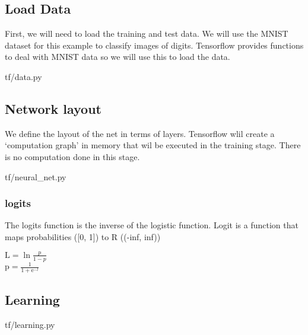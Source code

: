 \documentclass[11pt,a4paper]{article}
\begin{document}
\subsection{Load Data}

First, we will need to load the training and test data.
We will use the MNIST dataset for this example to classify images of digits.
Tensorflow provides functions to deal with MNIST data so we will use this to
load the data.


{tf/data.py}

\newpage
\subsection{Network layout}

We define the layout of the net in terms of layers.
Tensorflow wlil create a `computation graph' in memory that wil be executed
in the training stage. There is no computation done in this stage.


{tf/neural_net.py}

\subsubsection{logits}
The logits function is the inverse of the logistic function.
Logit is a function that maps probabilities ([0, 1]) to R ((-inf, inf))

$\mathrm{L} = \ln{\frac{p}{1 - p}}$\\
$\mathrm{p} = \frac{1}{1 + \mathrm{e}^{-l}}$


\newpage
\subsection{Learning}

{tf/learning.py}
\end{document}
